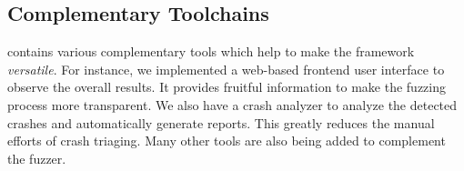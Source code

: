 \subsection{Complementary Toolchains}
{\FOT} contains various complementary tools which help to make the framework \textit{versatile}.
For instance, we implemented a web-based frontend user interface to observe the overall results.
It provides fruitful information to make the fuzzing process more transparent.
We also have a crash analyzer to analyze the detected crashes and automatically generate reports.
This greatly reduces the manual efforts of crash triaging.
Many other tools are also being added to complement the fuzzer.




